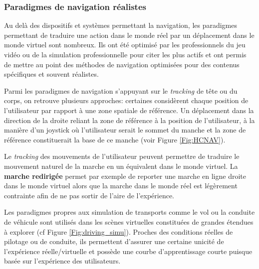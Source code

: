\subsubsection{Paradigmes de navigation réalistes}

Au delà des dispositifs et systèmes permettant la navigation, les paradigmes permettant de traduire une action dans le monde réel par un déplacement dans le monde virtuel sont nombreux. Ils ont été optimisé par les professionnels du jeu vidéo ou de la simulation professionnelle pour citer les plus actifs et ont permis de mettre au point des méthodes de navigation optimisées pour des contenus spécifiques et souvent réalistes.

Parmi les paradigmes de navigation s'appuyant sur le \textit{tracking} de tête ou du corps, on retrouve plusieurs approches: certaines considèrent chaque position de l'utilisateur par rapport à une zone spatiale de référence. Un déplacement dans la direction de la droite reliant la zone de référence à la position de l'utilisateur, à la manière d'un joystick où l'utilisateur serait le sommet du manche et la zone de référence constituerait la base de ce manche (voir Figure \ref{Fig:HCNAV}).


Le \textit{tracking} des mouvements de l'utilisateur peuvent permettre de traduire le mouvement naturel de la marche en un équivalent dans le monde virtuel. La \textbf{marche redirigée} permet par exemple de reporter une marche en ligne droite dans le monde virtuel alors que la marche dans le monde réel est légèrement contrainte afin de ne pas sortir de l'aire de l'expérience.

Les paradigmes propres aux simulation de transports comme le vol ou la conduite de véhicule sont utilisés dans les scènes virtuelles constituées de grandes étendues à explorer (cf Figure \ref{Fig:driving_simu}). Proches des conditions réelles de pilotage ou de conduite, ils permettent d'assurer une certaine unicité de l'expérience réelle/virtuelle et possède une courbe d'apprentissage courte puisque basée sur l'expérience des utilisateurs.

